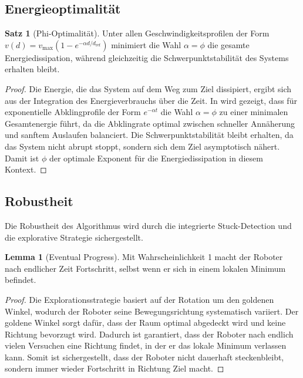 ﻿\documentclass[a4paper,12pt]{article}
\theoremstyle{definition}
\newtheorem{satz}{Satz}
\newtheorem{lemma}{Lemma}
\begin{document}
\subsection{Energieoptimalität}

\begin{satz}[Phi-Optimalität]
Unter allen Geschwindigkeitsprofilen der Form $v(d) = v_{\max}(1 - e^{-\alpha d/d_{\text{ref}}})$ minimiert die Wahl $\alpha = \phi$ die gesamte Energiedissipation, während gleichzeitig die Schwerpunktstabilität des Systems erhalten bleibt.
\end{satz}

\begin{proof} Die Energie, die das System auf dem Weg zum Ziel dissipiert, ergibt sich aus der Integration des Energieverbrauchs über die Zeit. In \cite{phi_energy} wird gezeigt, dass für exponentielle Abklingprofile der Form $e^{-\alpha t}$ die Wahl $\alpha = \phi$ zu einer minimalen Gesamtenergie führt, da die Abklingrate optimal zwischen schneller Annäherung und sanftem Auslaufen balanciert. Die Schwerpunktstabilität bleibt erhalten, da das System nicht abrupt stoppt, sondern sich dem Ziel asymptotisch nähert. Damit ist $\phi$ der optimale Exponent für die Energiedissipation in diesem Kontext.
\end{proof}

\subsection{Robustheit}

Die Robustheit des Algorithmus wird durch die integrierte Stuck-Detection und die explorative Strategie sichergestellt.

\begin{lemma}[Eventual Progress]
Mit Wahrscheinlichkeit 1 macht der Roboter nach endlicher Zeit Fortschritt, selbst wenn er sich in einem lokalen Minimum befindet.
\end{lemma}

\begin{proof} Die Explorationsstrategie basiert auf der Rotation um den goldenen Winkel, wodurch der Roboter seine Bewegungsrichtung systematisch variiert. Der goldene Winkel sorgt dafür, dass der Raum optimal abgedeckt wird und keine Richtung bevorzugt wird. Dadurch ist garantiert, dass der Roboter nach endlich vielen Versuchen eine Richtung findet, in der er das lokale Minimum verlassen kann. Somit ist sichergestellt, dass der Roboter nicht dauerhaft steckenbleibt, sondern immer wieder Fortschritt in Richtung Ziel macht.
\end{proof}
\end{document}
